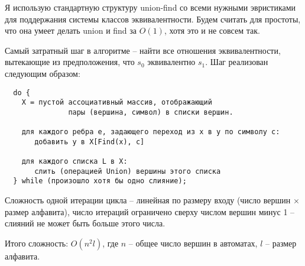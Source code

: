\documentclass[a4paper, 12pt, onepage]{article}
\begin{document}
Я использую стандартную структуру union-find со всеми нужными эвристиками для поддержания системы
классов эквивалентности. Будем считать для простоты, что она умеет делать union и find за $O(1)$,
хотя это и не совсем так.

Самый затратный шаг в алгоритме -- найти все отношения эквивалентности, вытекающие из предположения, что $s_0$
эквивалентно $s_1$. Шаг реализован следующим образом:

\begin{verbatim}
  do {
    X = пустой ассоциативный массив, отображающий
               пары (вершина, символ) в списки вершин.

    для каждого ребра e, задающего переход из x в y по символу c:
       добавить y в X[Find(x), c]

    для каждого списка L в X:
       слить (операцией Union) вершины этого списка
  } while (произошло хотя бы одно слияние);
\end{verbatim}

Сложность одной итерации цикла -- линейная по размеру входу (число вершин $\times$ размер алфавита),
число итераций ограничено сверху числом вершин минус 1 -- слияний не может быть больше этого числа.

Итого сложность: $O(n^2l)$, где $n$ -- общее число вершин в автоматах, $l$ -- размер алфавита.
\end{document}
